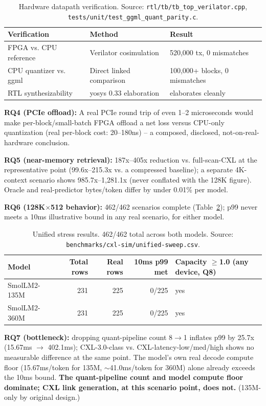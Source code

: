 \documentclass[11pt]{article}
\begin{document}
\begin{table}[h]
\centering
\small
\begin{tabular}{@{}lll@{}}
\toprule
Verification & Method & Result \\
\midrule
FPGA vs. CPU reference & Verilator cosimulation & 520{,}000 tx, 0 mismatches \\
CPU quantizer vs. ggml & Direct linked comparison & 100{,}000+ blocks, 0 mismatches \\
RTL synthesizability & yosys 0.33 elaboration & elaborates cleanly \\
\bottomrule
\end{tabular}
\caption{Hardware datapath verification. Source: \texttt{rtl/tb/tb\_top\_verilator.cpp},
\texttt{tests/unit/test\_ggml\_quant\_parity.c}.}
\label{tab:hw-verification}
\end{table}

\textbf{RQ4 (PCIe offload):} A real PCIe round trip of even 1--2
microseconds would make per-block/small-batch FPGA offload a net loss
versus CPU-only quantization (real per-block cost: 20--180ns) -- a
composed, disclosed, not-on-real-hardware conclusion.

\textbf{RQ5 (near-memory retrieval):} 187x--405x reduction vs.
full-scan-CXL at the representative point (99.6x--215.3x vs. a
compressed baseline); a separate 4K-context scenario shows
985.7x--1{,}281.1x (never conflated with the 128K figure). Oracle and
real-predictor bytes/token differ by under 0.01\% per model.

\textbf{RQ6 (128K$\times$512 behavior):} 462/462 scenarios complete
(Table~\ref{tab:unified-stress}); p99 never meets a 10ms illustrative
bound in any real scenario, for either model.

\begin{table}[h]
\centering
\small
\begin{tabular}{@{}lrrrl@{}}
\toprule
Model & Total rows & Real rows & 10ms p99 met & Capacity $\geq$1.0 (any device, Q8) \\
\midrule
SmolLM2-135M & 231 & 225 & 0/225 & yes \\
SmolLM2-360M & 231 & 225 & 0/225 & yes \\
\bottomrule
\end{tabular}
\caption{Unified stress results. 462/462 total across both models.
Source: \texttt{benchmarks/cxl-sim/unified-sweep.csv}.}
\label{tab:unified-stress}
\end{table}

\textbf{RQ7 (bottleneck):} dropping quant-pipeline count 8$\to$1
inflates p99 by 25.7x (15.67ms $\to$ 402.1ms); CXL-3.0-class vs.
CXL-latency-low/med/high shows no measurable difference at the same
point. The model's own real decode compute floor (15.67ms/token for
135M, $\sim$41.0ms/token for 360M) alone already exceeds the 10ms bound.
\textbf{The quant-pipeline count and model compute floor dominate; CXL
link generation, at this scenario point, does not.} (135M-only by
original design.)
\end{document}

